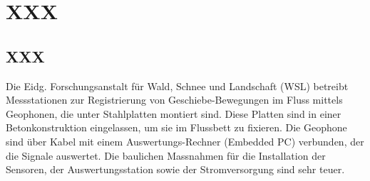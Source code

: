 %
%

\chapter{XXX}\label{chap.XXX}



\section{XXX}\label{sec.XXX}
Die Eidg. Forschungsanstalt für Wald, Schnee und Landschaft (WSL) betreibt Messstationen zur Registrierung von Geschiebe-Bewegungen im Fluss mittels Geophonen, die unter Stahlplatten montiert sind. Diese Platten sind in einer Betonkonstruktion eingelassen, um sie im Flussbett zu fixieren. Die Geophone sind über Kabel mit einem Auswertungs-Rechner (Embedded PC) verbunden, der die Signale auswertet. Die baulichen Massnahmen für die Installation der Sensoren, der Auswertungsstation sowie der Stromversorgung sind sehr teuer. 


